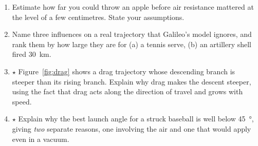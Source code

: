 \documentclass[11pt,twoside,openany]{book}
\begin{document}
\begin{enumerate}[label=\textbf{\thechapter.\arabic*},resume=exercises,leftmargin=*]
  \item Estimate how far you could throw an apple before air resistance mattered at the level of a few centimetres. State your assumptions.
  \item Name three influences on a real trajectory that Galileo's model ignores, and rank them by how large they are for (a) a tennis serve, (b) an artillery shell fired \SI{30}{\kilo\metre}.
  \item $\star$ Figure~\ref{fig:drag} shows a drag trajectory whose descending branch is steeper than its rising branch. Explain why drag makes the descent steeper, using the fact that drag acts along the direction of travel and grows with speed.
  \item $\star$ Explain why the best launch angle for a struck baseball is well below \SI{45}{\degree}, giving \emph{two} separate reasons, one involving the air and one that would apply even in a vacuum.
\end{enumerate}
\end{document}
